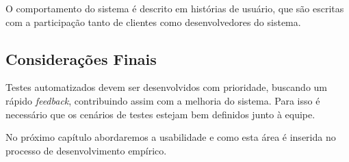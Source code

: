 O comportamento do sistema é descrito em histórias de usuário, que são 
escritas com a participação tanto de clientes como desenvolvedores do sistema. 


\subsection{Considerações Finais}

Testes automatizados devem ser desenvolvidos com prioridade, buscando um rápido 
\textit{feedback}, contribuindo assim com a melhoria do sistema. Para isso é 
necessário que os cenários de testes estejam bem definidos junto à equipe.

No próximo capítulo abordaremos a usabilidade e como esta área é inserida no processo de desenvolvimento empírico.

